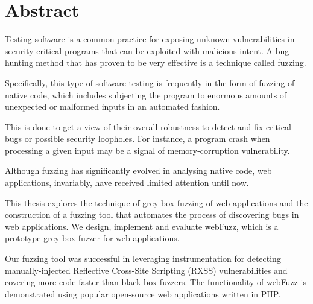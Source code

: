 \section*{\LARGE{Abstract}}

Testing software is a common practice for exposing unknown vulnerabilities
in security-critical programs that can be exploited with malicious intent.
A bug-hunting method that has proven to be very effective is a technique
called fuzzing. 

Specifically, this type of software testing is frequently in the
form of fuzzing of native code, which includes subjecting the program to
enormous amounts of unexpected or malformed inputs in an automated fashion.

This is done to get a view of their overall robustness to detect and fix
critical bugs or possible security loopholes. For instance, a program crash
when processing a given input may be a signal of memory-corruption
vulnerability.

Although fuzzing has significantly evolved in analysing native code, web
applications, invariably, have received limited attention until now. 

This thesis explores the technique of grey-box fuzzing of web applications and the
construction of a fuzzing tool that automates the process of discovering
bugs in web applications. We design, implement and evaluate webFuzz, which is a prototype grey-box
fuzzer for web applications. 

Our fuzzing tool was successful in leveraging instrumentation for detecting manually-injected Reflective Cross-Site Scripting (RXSS) vulnerabilities and covering more code faster than 
black-box fuzzers. The functionality of webFuzz is demonstrated using popular open-source web applications written in PHP.